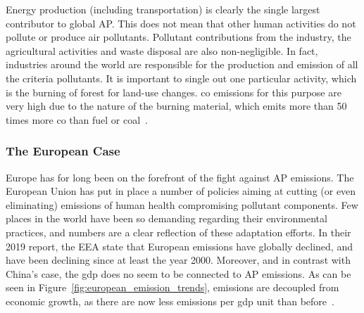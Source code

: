 Energy production (including transportation) is clearly the single
largest contributor to global \gls{AP}. This does not mean that other
human activities do not pollute or produce air pollutants. Pollutant
contributions from the industry, the agricultural activities and waste
disposal are also non-negligible. In fact, industries around the world
are responsible for the production and emission of all the criteria
pollutants. It is important to single out one particular activity, which
is the burning of forest for land-use changes. \gls{co} emissions for
this purpose are very high due to the nature of the burning material,
which emits more than 50 times more \gls{co} than fuel or
coal~\cite{CABI2019}.

\subsubsection{The European Case}%
\label{ssub:the_european_case}

Europe has for long been on the forefront of the fight against \gls{AP}
emissions. The European Union has put in place a number of policies
aiming at cutting (or even eliminating) emissions of human health
compromising pollutant components. Few places in the world have been so
demanding regarding their environmental practices, and numbers are a
clear reflection of these adaptation efforts. In their 2019 report, the
\gls{EEA} state that European emissions have globally declined, and have
been declining since at least the year 2000. Moreover, and in contrast
with China's case, the \gls{gdp} does no seem to be connected to
\gls{AP} emissions. As can be seen in
Figure~\ref{fig:european_emission_trends}, emissions are decoupled from
economic growth, as there are now less emissions per \gls{gdp} unit than
before~\cite{EEA2019}.

